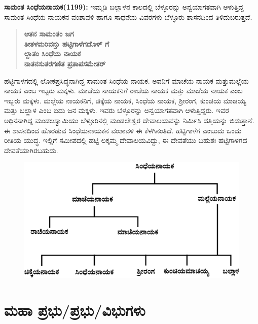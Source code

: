 \textbf{ಸಾಮಂತ ಸಿಂಧೆಯನಾಯಕ(1199):} ಇಮ್ಮಡಿ ಬಲ್ಲಾಳನ ಕಾಲದಲ್ಲಿ ಬೆಳ್ಳೂರನ್ನು ಅನ್ವಯಾಗತವಾಗಿ ಆಳುತ್ತಿದ್ದ ಸಾಮಂತ ಸಿಂಧೆಯ ನಾಯಕನ ವಂಶಾವಳಿ ಹಾಗೂ ಸಾಧನೆಯ ವಿವರಗಳು ಬೆಳ್ಳೂರು ಶಾಸನದಿಂದ ತಿಳಿದುಬರುತ್ತದೆ.

\begin{verse}
\textbf{ಆತನ ಸಾಮಂತಂ ಜಗ} \\\textbf{ತೀತಳಮರಿವನ್ತು ಹಟ್ಟಿಗಾಳೆಗದೊಳ್​ ಗೆ} \\\textbf{ಲ್ದಾತಂ ಸಿಂಧೆಯ ನಾಯಕ } \\\textbf{ನಾತನಸುತರಗಣಿತ ಪ್ರತಾಪಸಮೇತರ್​ }
\end{verse}

ಹಟ್ಟಿಗಾಳಗದಲ್ಲಿ ಲೋಕಪ್ರಸಿದ್ಧನಾಗಿದ್ದ ಸಾಮಂತ ಸಿಂಧೆಯ ನಾಯಕ. ಅವನಿಗೆ ಮಾಚೆಯ ನಾಯಕ ಮತ್ತು\break ಮಲ್ಲೆಯ ನಾಯಕ ಎಂಬ ಇಬ್ಬರು ಮಕ್ಕಳು. ಮಾಚೆಯ ನಾಯಕನಿಗೆ ರಾಚೆಯ ನಾಯಕ ಮತ್ತು ಮಾಚೆಯ ನಾಯಕ ಎಂಬ ಇಬ್ಬರು ಮಕ್ಕಳು. ಮಲ್ಲೆಯ ನಾಯಕನಿಗೆ, ಚಿಕ್ಕೆಯ ನಾಯಕ, ಸಿಂಧೆಯ ನಾಯಕ, ಶ‍್ರೀರಂಗ, ಕುಂಚಿಯ ಮಾಚಯ್ಯ ಮತ್ತು ಬಲ್ಲಾಳ ಎಂಬ ಐದು ಜನ ಮಕ್ಕಳು. ಇವರು ಬೆಳ್ಳೂರನ್ನು ಅನ್ವಯಾಗತವಾಗಿ ಆಳುತ್ತಿದ್ದರು. ಇವರ ಅಧಿನನಾಗಿದ್ದ ಮಂಡಲಸ್ವಾಮಿಯು ಬೆಳ್ಳೂರಿನಲ್ಲಿ ಮಂಡಲೇಶ್ವರ ದೇವಾಲಯವನ್ನು ನಿರ್ಮಿಸಿ ದತ್ತಿಯನ್ನು ಬಿಡುತ್ತಾನೆ. ಈ ಶಾಸನದಿಂದ ಹೊರಡುವ ಸಿಂಧೆಯನಾಯಕನ ವಂಶಾವಳಿ ಈ ಕೆಳಗಿನಂತಿದೆ. ಹಟ್ಟಿಗಾಳೆಗ ಎಂಬುದು ಒಂದು ರೀತಿಯ ಯುದ್ಧ. ಇಲ್ಲಿಗೆ ಸಮೀಪದಲ್ಲಿ ಹಟ್ಟಿ ಲಕ್ಕಮ್ಮ ದೇವಾಲಯವಿದ್ದು, ಈ ದೇವತೆಯು ಬಹುಶಃ ಹಟ್ಟಿಗಾಳಗದ ದೇವತೆಯಾಗಿರಬಹುದು.

\begin{figure}[H]
\includegraphics[scale=1.25]{images/chap3/chap3fig9.jpeg}
\end{figure}


\section{ಮಹಾ ಪ್ರಭು/ಪ್ರಭು/ವಿಭುಗಳು}

